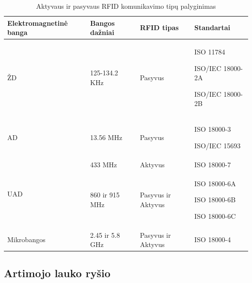 \begin{table}[!ht]
    \centering
    \renewcommand{\arraystretch}{1,5}
    \begin{tabular}{m{9em}m{8em}m{8em}m{8em}} 
        \hline
        Elektromagnetinė banga            & Bangos dažniai    & RFID tipas    &Standartai   \\ 
        \hline
        ŽD                     & 125-134.2 KHz & Pasyvus & ISO 11784 \par ISO/IEC 18000-2A \par ISO/IEC 18000-2B   \\ 
        \hline
        AD                     & 13.56 MHz & Pasyvus  &  ISO 18000-3 \par ISO/IEC 15693 \\ 
        \hline
        \multirow{2}{*}{UAD} & 433 MHz       & Aktyvus   &  ISO 18000-7    \\ 
        \cline{2-4}
                                & 860 ir 915 MHz      &  Pasyvus ir Aktyvus  &  ISO 18000-6A \par ISO 18000-6B \par ISO 18000-6C    \\ 
        \hline
        Mikrobangos                       & 2.45 ir 5.8 GHz         & Pasyvus ir Aktyvus &  ISO 18000-4  \\
        \hline
    \end{tabular}
    \caption{Aktyvaus ir pasyvaus RFID komunikavimo tipų palyginimas}
\end{table}

\subsection{Artimojo lauko ryšio}
